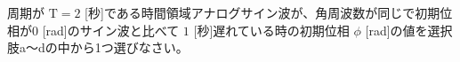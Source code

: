 周期が $\textrm{T}=2$ [秒]である時間領域アナログサイン波が、角周波数が同じで初期位相が$0$ [rad]のサイン波と比べて $1$ [秒]遅れている時の初期位相 $\phi$ [rad]の値を選択肢a〜dの中から1つ選びなさい。

